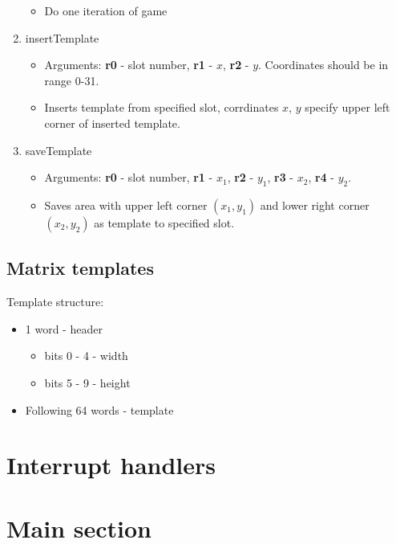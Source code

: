 \begin{enumerate}
\begin{itemize}
			\item Do one iteration of game
		\end{itemize}
	\item insertTemplate
		\begin{itemize}
			\item Arguments: \textbf{r0} - slot number, \textbf{r1} - $x$, \textbf{r2} - $y$. Coordinates should be in range 0-31.
			\item Inserts template from specified slot, corrdinates $x$, $y$ specify upper left corner of inserted template.
		\end{itemize}
	\item saveTemplate
		\begin{itemize}
			\item Arguments: \textbf{r0} - slot number, \textbf{r1} - $x_{1}$, \textbf{r2} - $y_{1}$, \textbf{r3} - $x_{2}$, \textbf{r4} - $y_{2}$.
			\item Saves area with upper left corner $(x_{1}, y_{1})$ and lower right corner $(x_{2}, y_{2})$ as template to specified slot.
		\end{itemize}
\end{enumerate}

\subsection*{Matrix templates}

Template structure:

\begin{itemize}
	\item 1 word - header
		\begin{itemize}
			\item bits 0 - 4 - width
			\item bits 5 - 9 - height
		\end{itemize}
	\item Following 64 words - template
\end{itemize}

\section*{Interrupt handlers}

\section*{Main section}


